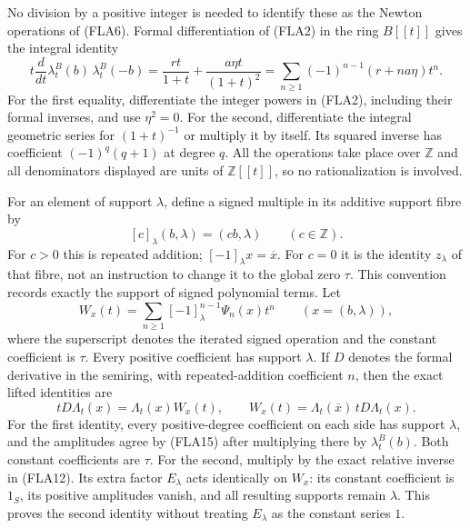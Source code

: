 No division by a positive integer is needed to identify these as
the Newton operations of (FLA6). Formal differentiation of (FLA2)
in the ring $B[[t]]$ gives the integral identity
\begin{equation}\tag{FLA15}
 t\frac{d}{dt}\lambda_t^B(b)\,
                   \lambda_t^B(-b)
  =\frac{rt}{1+t}+\frac{a\eta t}{(1+t)^2}
  =\sum_{n\ge1}(-1)^{n-1}(r+na\eta)t^n.
\end{equation}
For the first equality, differentiate the integer powers in
(FLA2), including their formal inverses, and use $\eta^2=0$.
For the second, differentiate the integral geometric series for
$(1+t)^{-1}$ or multiply it by itself. Its squared inverse has
coefficient $(-1)^q(q+1)$ at degree $q$. All the operations take
place over $\mathbb Z$ and all denominators displayed are units
of $\mathbb Z[[t]]$, so no rationalization is involved.

For an element of support $\lambda$, define a signed multiple in
its additive support fibre by
\[
 [c]_\lambda(b,\lambda)=(cb,\lambda)\qquad(c\in\mathbb Z).
\]
For $c>0$ this is repeated addition; $[-1]_\lambda x=\overline x$.
For $c=0$ it is the identity $z_\lambda$ of that fibre, not an
instruction to change it to the global zero $\tau$. This convention
records exactly the support of signed polynomial terms.
Let
\begin{equation}\tag{FLA16}
 W_x(t)=\sum_{n\ge1}[-1]^{n-1}_\lambda\Psi_n(x)t^n
             \qquad(x=(b,\lambda)),
\end{equation}
where the superscript denotes the iterated signed operation and
the constant coefficient is $\tau$. Every positive coefficient
has support $\lambda$. If $D$ denotes the formal derivative in
the semiring, with repeated-addition coefficient $n$, then the
exact lifted identities are
\begin{equation}\tag{FLA17}
 tD\Lambda_t(x)=\Lambda_t(x)W_x(t),\qquad
 W_x(t)=\Lambda_t(\overline x)\,tD\Lambda_t(x).
\end{equation}
For the first identity, every positive-degree coefficient on each
side has support $\lambda$, and the amplitudes agree by (FLA15)
after multiplying there by $\lambda_t^B(b)$. Both constant
coefficients are $\tau$. For the second, multiply by the exact
relative inverse in (FLA12). Its extra factor $E_\lambda$ acts
identically on $W_x$: its constant coefficient is $1_S$, its
positive amplitudes vanish, and all resulting supports remain
$\lambda$. This proves the second identity without treating
$E_\lambda$ as the constant series $1$.

